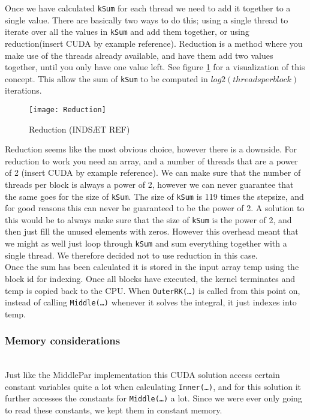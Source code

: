 Once we have calculated \texttt{kSum} for each thread we need to add it together to a single value. There are basically two ways to do this; using a single thread to iterate over all the values in \texttt{kSum} and add them together, or using reduction(insert CUDA by example reference). Reduction is a method where you make use of the threads already available, and have them add two values together, until you only have one value left. See figure \ref{fig:reduction} for a visualization of this concept. This allow the sum of \texttt{kSum} to be computed in $log2(threadsperblock)$ iterations.\\

\begin{figure}[ht!]
  \centering
    \texttt{[image: Reduction]}
  \caption{Reduction (INDSÆT REF)}
  \label{fig:reduction}
\end{figure}

Reduction seems like the most obvious choice, however there is a downside. For reduction to work you need an array, and a number of threads that are a power of 2 (insert CUDA by example reference). We can make sure that the number of threads per block is always a power of 2, however we can never guarantee that the same goes for the size of \texttt{kSum}. The size of \texttt{kSum} is 119 times the stepsize, and for good reasons this can never be guaranteed to be the power of 2. A solution to this would be to always make sure that the size of \texttt{kSum} is the power of 2, and then just fill the unused elements with zeros. However this overhead meant that we might as well just loop through \texttt{kSum} and sum everything together with a single thread. We therefore decided not to use reduction in this case.\\

Once the sum has been calculated it is stored in the input array temp using the block id for indexing. Once all blocks have executed, the kernel terminates and temp is copied back to the CPU. When \texttt{OuterRK(…)} is called from this point on, instead of calling \texttt{Middle(…)} whenever it solves the integral, it just indexes into temp.

\subsubsection{Memory considerations} \hfill \\
Just like the MiddlePar implementation this CUDA solution access certain constant variables quite a lot when calculating \texttt{Inner(…)}, and for this solution it further accesses the constants for \texttt{Middle(…)} a lot. Since we were ever only going to read these constants, we kept them in constant memory.\\

